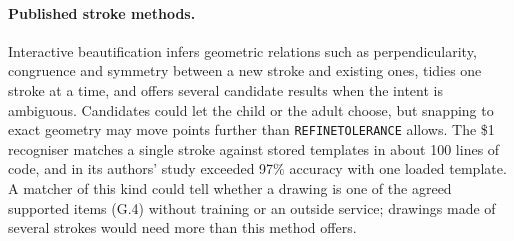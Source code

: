 \documentclass[12pt]{article}
\renewcommand{\_}{\textunderscore\allowbreak}%
\begin{document}
\paragraph{Published stroke methods.}
Interactive beautification \citep{IgarashiEtAl1997} infers geometric relations
such as perpendicularity, congruence and symmetry between a new stroke and
existing ones, tidies one stroke at a time, and offers several candidate results
when the intent is ambiguous. Candidates could let the child or the adult
choose, but snapping to exact geometry may move points further than
\texttt{REFINE\_TOLERANCE} allows. The \$1 recogniser \citep{WobbrockEtAl2007}
matches a single stroke against stored templates in about 100 lines of code, and
in its authors' study exceeded 97\% accuracy with one loaded template. A matcher
of this kind could tell whether a drawing is one of the agreed supported items
(G.4) without training or an outside service; drawings made of several strokes
would need more than this method offers.
\end{document}
